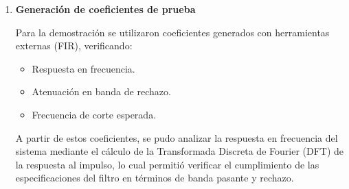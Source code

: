 \documentclass[a4,11pt]{article}
\begin{document}
\begin{enumerate}
Esto permitió trabajar con señales reales de audio, además de las señales sintéticas generadas internamente. Para ello se implementaron las siguientes funcionalidades:

\begin{itemize}
\item Lectura de archivos WAV utilizando la librería estándar de Python.
\item Conversión automática de muestras a formato punto fijo Q1.31 para su procesamiento por el filtro en C.
\item Soporte para distintos formatos de cuantización (16 bits y 32 bits).
\item Selección automática de un canal en caso de señales multicanal.
\end{itemize}

Adicionalmente, se implementó la conversión inversa:

\begin{itemize}
\item Transformación de la salida del filtro (formato PCM32) nuevamente a formato WAV.
\item Generación automática de un archivo de salida con el sufijo \texttt{\_output}, permitiendo la reproducción y análisis posterior del resultado.
\end{itemize}

Esta funcionalidad resulta clave para validar el comportamiento del filtro sobre señales reales, así como para facilitar su integración en flujos de trabajo de procesamiento de audio.

\item \textbf{Generación de coeficientes de prueba}

Para la demostración se utilizaron coeficientes generados con herramientas externas (FIR), verificando:

\begin{itemize}
\item Respuesta en frecuencia.
\item Atenuación en banda de rechazo.
\item Frecuencia de corte esperada.
\end{itemize}

\par A partir de estos coeficientes, se pudo analizar la respuesta en frecuencia del sistema mediante el cálculo de la Transformada Discreta de Fourier (DFT) de la respuesta al impulso, lo cual permitió verificar el cumplimiento de las especificaciones del filtro en términos de banda pasante y rechazo.


\end{enumerate}
\end{document}
